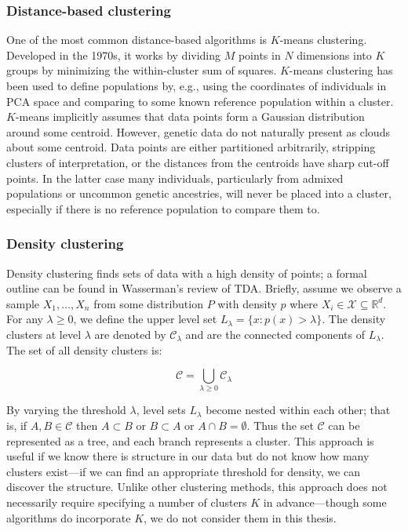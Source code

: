 \subsubsection{Distance-based clustering}

One of the most common distance-based algorithms is $K$-means clustering. Developed in the 1970s, it works by dividing $M$ points in $N$ dimensions into $K$ groups by minimizing the within-cluster sum of squares\citep{hartigan_algorithm_1979}. $K$-means clustering has been used to define populations by, e.g., using the coordinates of individuals in PCA space and comparing to some known reference population within a cluster. $K$-means implicitly assumes that data points form a Gaussian distribution around some centroid\citep{mcinnes_accelerated_2017}. However, genetic data do not naturally present as clouds about some centroid. Data points are either partitioned arbitrarily, stripping clusters of interpretation, or the distances from the centroids have sharp cut-off points. In the latter case many individuals, particularly from admixed populations or uncommon genetic ancestries, will never be placed into a cluster, especially if there is no reference population to compare them to\citep{ding_polygenic_2023}.

\subsubsection{Density clustering}

Density clustering finds sets of data with a high density of points; a formal outline can be found in Wasserman's review of TDA\citep{wasserman_topological_2018}. Briefly, assume we observe a sample $X_{1}, \dots , X_{n}$ from some distribution $P$ with density $p$ where $X_{i} \in \mathcal{X} \subseteq \mathbb{R}^d$. For any $\lambda \ge 0$, we define the upper level set $L_{\lambda} = \{x: p(x) > \lambda \}$. The density clusters at level $\lambda$ are denoted by $\mathcal{C}_{\lambda}$ and are the connected components of $L_{\lambda}$. The set of all density clusters is:

$$ \mathcal{C} = \bigcup_{\lambda \ge 0} \mathcal{C}_{\lambda} $$

By varying the threshold $\lambda$, level sets $L_{\lambda}$ become nested within each other; that is, if $A, B \in \mathcal{C}$ then $A \subset B$ or $B \subset A$ or $A \cap B = \emptyset$. Thus the set $\mathcal{C}$ can be represented as a tree, and each branch represents a cluster. This approach is useful if we know there is structure in our data but do not know how many clusters exist---if we can find an appropriate threshold for density, we can discover the structure. Unlike other clustering methods, this approach does not necessarily require specifying a number of clusters $K$ in advance---though some algorithms do incorporate $K$, we do not consider them in this thesis.

